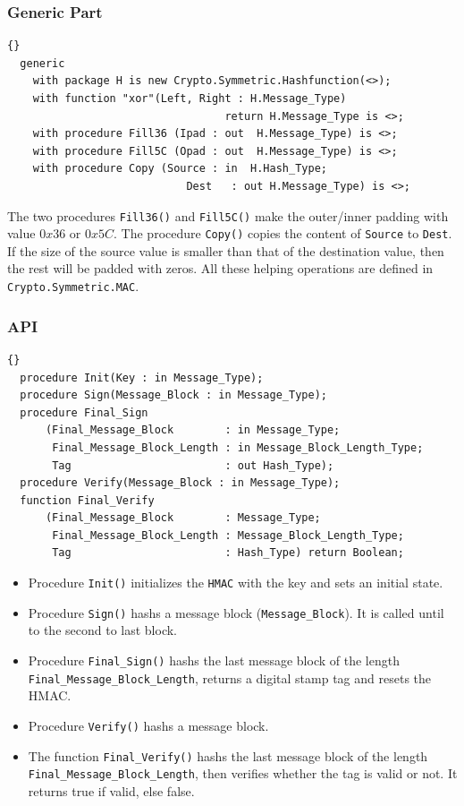 \subsubsection*{Generic Part}
\begin{lstlisting}{}
  generic
    with package H is new Crypto.Symmetric.Hashfunction(<>);
    with function "xor"(Left, Right : H.Message_Type)
      					          return H.Message_Type is <>;
    with procedure Fill36 (Ipad : out  H.Message_Type) is <>;
    with procedure Fill5C (Opad : out  H.Message_Type) is <>;
    with procedure Copy (Source : in  H.Hash_Type;
      					    Dest   : out H.Message_Type) is <>;
\end{lstlisting}
The two procedures \texttt{Fill36()} and \texttt{Fill5C()} make the
outer/inner padding with value $0x36$ or $0x5C$.  The procedure
\texttt{Copy()} copies the content of \texttt{Source} to
\texttt{Dest}. If the size of the source value is smaller than that of
the destination value, then the rest will be padded with zeros.  All
these helping operations are defined in
\texttt{Crypto.Symmetric.MAC}.

\subsubsection*{API}
\begin{lstlisting}{}
  procedure Init(Key : in Message_Type);
  procedure Sign(Message_Block : in Message_Type);
  procedure Final_Sign
      (Final_Message_Block        : in Message_Type;
       Final_Message_Block_Length : in Message_Block_Length_Type;
       Tag                        : out Hash_Type);
  procedure Verify(Message_Block : in Message_Type);
  function Final_Verify
      (Final_Message_Block        : Message_Type;
       Final_Message_Block_Length : Message_Block_Length_Type;
       Tag                        : Hash_Type) return Boolean;
\end{lstlisting}
\begin{itemize}
\item Procedure \texttt{Init()} initializes the \texttt{HMAC} with the
  key and sets an initial state.
\item Procedure \texttt{Sign()} hashs a message block
  (\texttt{Message\_Block}). It is called until to the second to last
  block.
\item Procedure \texttt{Final\_Sign()} hashs the last message block of
  the length \texttt{Final\_Message\_B\-lock\_Length}, returns a
  digital stamp tag and resets the HMAC.
\item Procedure \texttt{Verify()} hashs a message block.
\item The function \texttt{Final\_Verify()} hashs the last message
  block of the length \texttt{Final\_Message\_B\-lock\_Length}, then
  verifies whether the tag is valid or not. It returns true if valid,
  else false.
\end{itemize}

